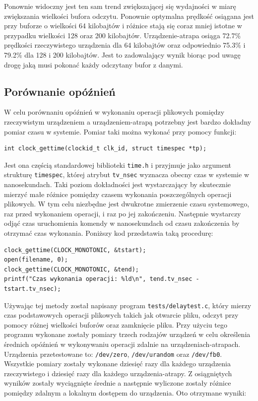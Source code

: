 \documentclass[11pt]{scrartcl}
\begin{document}
Ponownie widoczny jest ten sam trend zwiększającej się wydajności w miarę zwiększania wielkości bufora odczytu. Ponownie optymalna prędkość osiągana jest przy buforze o wielkości 64 kilobajtów i różnice stają się coraz mniej istotne w przypadku wielkości 128 oraz 200 kilobajtów. Urządzenie-atrapa osiąga 72.7\% prędkości rzeczywistego urządzenia dla 64 kilobajtów oraz odpowiednio 75.3\% i 79.2\% dla 128 i 200 kilobajtów. Jest to zadowalający wynik biorąc pod uwagę drogę jaką musi pokonać każdy odczytany bufor z danymi.

\subsection{Porównanie opóźnień}

W celu porównaniu opóźnień w wykonaniu operacji plikowych pomiędzy rzeczywistym urządzeniem a urządzeniem-atrapą potrzebny jest bardzo dokładny pomiar czasu w systemie. Pomiar taki można wykonać przy pomocy funkcji:

\begin{verbatim}
int clock_gettime(clockid_t clk_id, struct timespec *tp);
\end{verbatim}

Jest ona częścią standardowej biblioteki \texttt{time.h} i przyjmuje jako argument strukturę \texttt{timespec}, której atrybut \texttt{tv\_nsec} wyznacza obecny czas w systemie w nanosekundach. Taki poziom dokładności jest wystarczający by skutecznie mierzyć małe różnice pomiędzy czasem wykonania poszczególnych operacji plikowych. W tym celu niezbędne jest dwukrotne zmierzenie czasu systemowego, raz przed wykonaniem operacji, i raz po jej zakończeniu. Następnie wystarczy odjąć czas uruchomienia komendy w nanosekundach od czasu zakończenia by otrzymać czas wykonania. Poniższy kod przedstawia taką procedurę:

\begin{verbatim}
clock_gettime(CLOCK_MONOTONIC, &tstart);
open(filename, 0);
clock_gettime(CLOCK_MONOTONIC, &tend);
printf("Czas wykonania operacji: %ld\n", tend.tv_nsec - tstart.tv_nsec);
\end{verbatim}

Używając tej metody został napisany program \texttt{tests/delaytest.c}, który mierzy czas podstawowych operacji plikowych takich jak otwarcie pliku, odczyt przy pomocy różnej wielkości buforów oraz zamknięcie pliku. Przy użyciu tego programu wykonane zostały pomiary trzech rodzajów urządzeń w celu określenia średnich opóźnień w wykonywaniu operacji zdalnie na urządzeniach-atrapach. Urządzenia przetestowane to: \texttt{/dev/zero}, \texttt{/dev/urandom} oraz \texttt{/dev/fb0}. Wszystkie pomiary zostały wykonane dziesięć razy dla każdego urządzenia rzeczywistego i dziesięć razy dla każdego urządzenia-atrapy. Z osiągniętych wyników zostały wyciągnięte średnie a następnie wyliczone zostały różnice pomiędzy zdalnym a lokalnym dostępem do urządzenia. Oto otrzymane wyniki:
\end{document}
